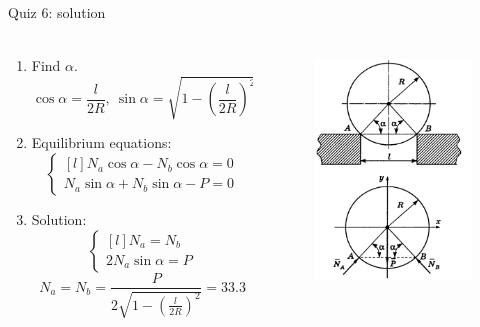 \documentclass[aspectratio=169,xcolor=table,10pt, notes=hide]{beamer}
\begin{document}
\begin{frame}[t]{Quiz 6: solution}
\framesubtitle{}
  \begin{columns}[T,onlytextwidth]
    \begin{column}{0.49\textwidth}
      \begin{enumerate}
        \item Find $\alpha$. $$\cos \alpha = \frac{l}{2R},\ \sin \alpha = \sqrt{1- \left(\frac{l}{2R}\right)^2}$$
        \item Equilibrium equations: $$ \left\{\begin{matrix*}[l]
        N_a \cos \alpha - N_b \cos \alpha = 0 \\
        N_a \sin \alpha + N_b \sin \alpha - P = 0
        \end{matrix*}\right. $$
        \item Solution: $$ \left\{\begin{matrix*}[l]
        N_a = N_b 
        \\ 2N_a \sin \alpha = P
        \end{matrix*}\right.$$
        $$ N_a=N_b = \frac{P}{2\sqrt{1-\left(\frac{l}{2R}\right)^2}}=33.3 $$
      \end{enumerate}
    \end{column}
    \begin{column}{0.49\textwidth}
      \begin{figure}[H]
        \centering\includegraphics[height=6cm,width=1\textwidth,keepaspectratio]{quiz6_1_sol.png}
        \label{fig:quiz6_1_sol.png}
      \end{figure}
    \end{column}
  \end{columns}
\end{frame}
\end{document}
